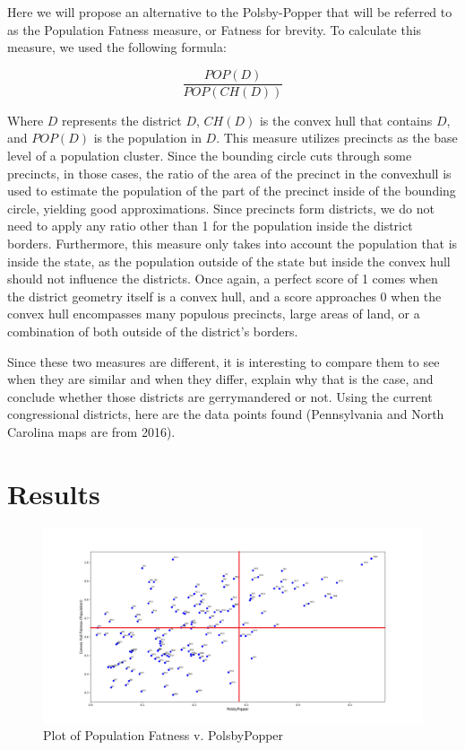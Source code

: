 \documentclass[letterpaper]{article}
\begin{document}
Here we will propose an alternative to the Polsby-Popper that will be referred to as the Population Fatness measure, or Fatness for brevity. To calculate this measure, we used the following formula:

\[
	\frac{POP(D)}{POP(CH(D))}
\]

Where $D$ represents the district $D$, $CH(D)$ is the convex hull that contains $D$, and $POP(D)$ is the population in $D$. This measure utilizes precincts as the base level of a population cluster. Since the bounding circle cuts through some precincts, in those cases, the ratio of the area of the precinct in the convexhull is used to estimate the population of the part of the precinct inside of the bounding circle, yielding good approximations. Since precincts form districts, we do not need to apply any ratio other than 1 for the population inside the district borders. Furthermore, this measure only takes into account the population that is inside the state, as the population outside of the state but inside the convex hull should not influence the districts. Once again, a perfect score of 1 comes when the district geometry itself is a convex hull, and a score approaches 0 when the convex hull encompasses many populous precincts, large areas of land, or a combination of both outside of the district's borders.


Since these two measures are different, it is interesting to compare them to see when they are similar and when they differ, explain why that is the case, and conclude whether those districts are gerrymandered or not. Using the current congressional districts, here are the data points found (Pennsylvania and North Carolina maps are from 2016).

\section{Results}

\begin{figure}[H]
	\includegraphics[width=\linewidth]{./figures/convexHullPopulationFatnessVPP2Edited.png}
	\caption{Plot of Population Fatness v. PolsbyPopper}
	\label{fig:datapoints}
\end{figure}
\end{document}
